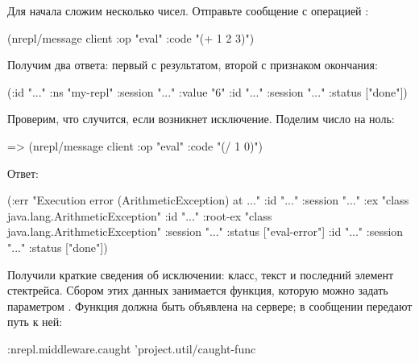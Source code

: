 Для начала сложим несколько чисел. Отправьте сообщение с операцией :

\begin{english}
  \begin{clojure}
(nrepl/message client
               {:op "eval" :code "(+ 1 2 3)"})
  \end{clojure}
\end{english}

Получим два ответа: первый с результатом, второй с признаком окончания:

\begin{english}
  \begin{clojure}
({:id "..."
  :ns "my-repl"
  :session "..."
  :value "6"}
 {:id "..."
  :session "..."
  :status ["done"]})
  \end{clojure}
\end{english}

Проверим, что случится, если возникнет исключение. Поделим число на ноль:

\begin{english}
  \begin{clojure}
=> (nrepl/message client
                  {:op "eval" :code "(/ 1 0)"})
  \end{clojure}
\end{english}

Ответ:

\begin{english}
  \begin{clojure}
({:err "Execution error (ArithmeticException) at ..."
  :id "..."
  :session "..."}
 {:ex "class java.lang.ArithmeticException"
  :id "..."
  :root-ex "class java.lang.ArithmeticException"
  :session "..."
  :status ["eval-error"]}
 {:id "..."
  :session "..."
  :status ["done"]})
  \end{clojure}
\end{english}

Получили краткие сведения об исключении: класс, текст и последний элемент стектрейса. Сбором этих данных занимается функция, которую можно задать параметром . Функция должна быть объявлена на сервере; в сообщении передают путь к ней:

\begin{english}
  \begin{clojure}
{:nrepl.middleware.caught 'project.util/caught-func}
  \end{clojure}
\end{english}

